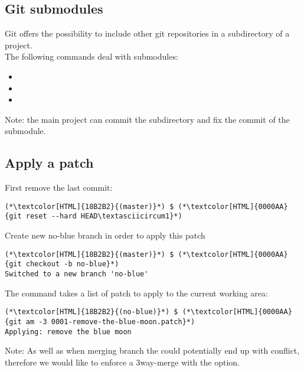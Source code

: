 \subsection{Git submodules}
\begin{frame}[fragile]
  \subslidetitle
  Git offers the possibility to include other git repositories in a subdirectory of a project.
  \\
  \vspace{1em}
  The following commands deal with submodules:
  \begin{itemize}
    \item {}
    \item {}
    \item {}
  \end{itemize}
  \vspace{1em}
  Note: the main project can commit the subdirectory and fix the commit of the submodule.
\end{frame}

\subsection{Apply a patch}
\begin{frame}[fragile]
    \subslidetitle
  First remove the last commit:
  \begin{lstlisting}
(*\textcolor[HTML]{18B2B2}{(master)}*) $ (*\textcolor[HTML]{0000AA}{git reset --hard HEAD\textasciicircum1}*)
\end{lstlisting}
  Create new no-blue branch in order to apply this patch
  \begin{lstlisting}
(*\textcolor[HTML]{18B2B2}{(master)}*) $ (*\textcolor[HTML]{0000AA}{git checkout -b no-blue}*)
Switched to a new branch 'no-blue'
\end{lstlisting}

  The  command takes a list of patch to apply to the current working area:
  \begin{lstlisting}
(*\textcolor[HTML]{18B2B2}{(no-blue)}*) $ (*\textcolor[HTML]{0000AA}{git am -3 0001-remove-the-blue-moon.patch}*)
Applying: remove the blue moon
\end{lstlisting}

  Note: As well as when merging branch the  could potentially end up with conflict, therefore we would like to enforce a 3way-merge with the  option.

\end{frame}

